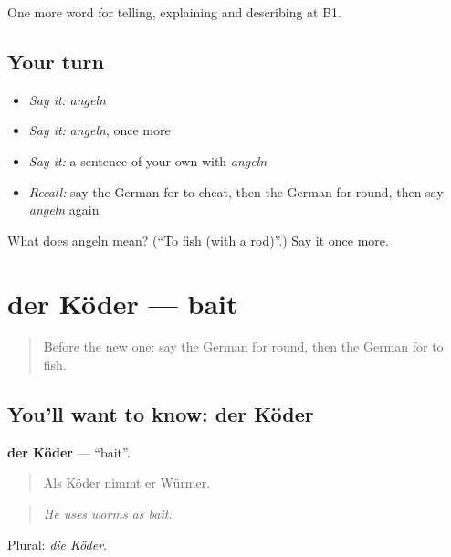 \begin{grammarlens}[title={What you've built}]
One more word for telling, explaining and describing at B1.
\end{grammarlens}

\subsection*{Your turn}
\begin{itemize}
\raggedright
  \item \emph{Say it:} \emph{angeln}
  \item \emph{Say it:} \emph{angeln}, once more
  \item \emph{Say it:} a sentence of your own with \emph{angeln}
  \item \emph{Recall:} say the German for to cheat, then the German for round, then say \emph{angeln} again
\end{itemize}

\begin{tcolorbox}[breakable,colback=teal!4,colframe=teal!35!black,title={Before you move on}]
What does angeln mean? (\textquotedblleft{}To fish (with a rod)\textquotedblright{}.) Say it once more.
\end{tcolorbox}
\section[der Köder]{der Köder — bait}

\label{lesson:GE-C502-koeder}



\begin{quote}
Before the new one: say the German for round, then the German for to fish.
\end{quote}

\subsection*{You'll want to know: der Köder}
\textbf{der Köder} — \textquotedblleft{}bait\textquotedblright{}.

\begin{quote}
Als Köder nimmt er Würmer.
\end{quote}

\begin{quote}
\emph{He uses worms as bait.}
\end{quote}

Plural: \emph{die Köder}.


